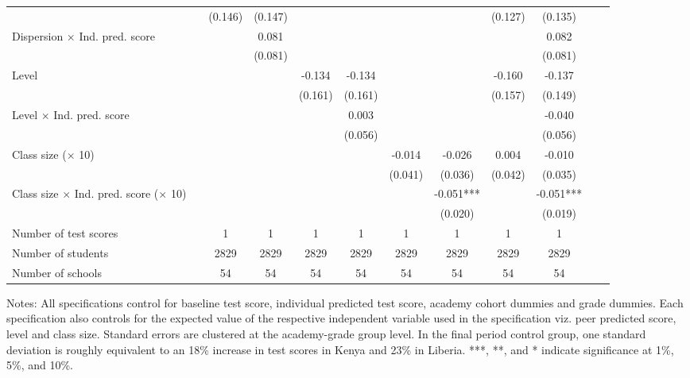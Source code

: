 \begin{center}
\begin{scriptsize}
\begin{threeparttable}
\begin{tabular} {@{} l l c c c c c c c c c c  @{}}
                 &  & (0.146) & (0.147) &  &  &  &  & (0.127) & (0.135) \\
Dispersion $\times$ Ind. pred. score &  &  & 0.081 &  &  &  &  &  & 0.082 \\
                 &  &  & (0.081) &  &  &  &  &  & (0.081) \\
Level &  &  &  & -0.134 & -0.134 &  &  & -0.160 & -0.137 \\
                 &  &  &  & (0.161) & (0.161) &  &  & (0.157) & (0.149) \\
Level $\times$ Ind. pred. score &  &  &  &  & 0.003 &  &  &  & -0.040 \\
                 &  &  &  &  & (0.056) &  &  &  & (0.056) \\
Class size ($\times$ 10) &  &  &  &  &  & -0.014 & -0.026 & 0.004 & -0.010 \\
                 &  &  &  &  &  & (0.041) & (0.036) & (0.042) & (0.035) \\
Class size $\times$ Ind. pred. score ($\times$ 10) &  &  &  &  &  &  & -0.051*** &  & -0.051*** \\
                 &  &  &  &  &  &  & (0.020) &  & (0.019) \\
\midrule
Number of test scores &  & 1 & 1 & 1 & 1 & 1 & 1 & 1 & 1 \\
Number of students &  & 2829 & 2829 & 2829 & 2829 & 2829 & 2829 & 2829 & 2829 \\
Number of schools &  & 54 & 54 & 54 & 54 & 54 & 54 & 54 & 54 \\
\bottomrule
\end{tabular}
\begin{tablenotes}
\item Notes: All specifications control for baseline test score, individual predicted test score, academy cohort dummies and grade dummies. Each specification also controls for the expected value of the respective independent variable used in the specification viz. peer predicted score, level and class size. Standard errors are clustered at the academy-grade group level. In the final period control group, one standard deviation is roughly equivalent to an 18\% increase in test scores in Kenya and 23\% in Liberia. ***, **, and * indicate significance at 1\%, 5\%, and 10\%.\end{tablenotes}
\end{threeparttable}
\end{scriptsize}
\end{center}
\clearpage
